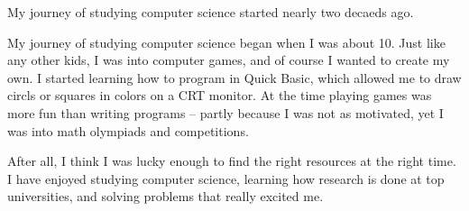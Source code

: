 
My journey of studying computer science started nearly two decaeds ago.



My journey of studying computer science began when I was about 10.
Just like any other kids, I was into computer games, and of course I wanted to create my own. 
I started learning how to program in Quick Basic, which allowed me to draw circls or squares in colors on a CRT monitor.
At the time playing games was more fun than writing programs -- partly because I was not as motivated, yet I was into math olympiads and competitions.




After all, I think I was lucky enough to find the right resources at the right time.  I have enjoyed studying computer science, learning how research is done at top universities, and solving problems that really excited me.

